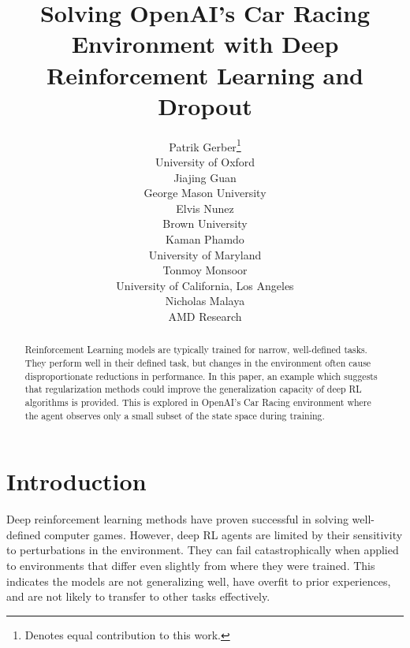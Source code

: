\documentclass{article}
\title{ %
  Solving OpenAI's
  Car Racing Environment with Deep Reinforcement Learning and Dropout}
\author{
  Patrik Gerber\thanks{Denotes equal contribution to this work.}\\
  University of Oxford \\
  \And
  Jiajing Guan\samethanks \\
  George Mason University \\ 
  \And
  Elvis Nunez\samethanks \\
  Brown University \\
  \And
  Kaman Phamdo\samethanks \\
  University of Maryland \\
  \And
  Tonmoy Monsoor \\
  University of California, Los Angeles \\
  \And
  Nicholas Malaya \\ %
  AMD Research \\ 
}
\begin{document}

\maketitle

\begin{abstract}

  


  
Reinforcement Learning models are typically trained for
narrow, well-defined tasks. They perform well in their defined task,
but changes in the environment often cause disproportionate reductions
in performance. In this paper, an example which suggests that
regularization methods could improve the generalization capacity of
deep RL algorithms is provided. 
This is explored in OpenAI’s Car Racing environment where the agent
observes only a small subset of the state space during training.
\end{abstract}

\vspace{-4mm}
\section{Introduction}
Deep reinforcement learning methods have proven successful in solving
well-defined computer
games\cite{mnih2013playing,silver2017mastering,zambaldi2018relational,bansal2017emergent}. 
However, deep RL agents are limited by their sensitivity
to perturbations in the environment. They can fail catastrophically
when applied to environments that differ even slightly from where they
were trained\cite{kansky2017schema,taylor2009transfer}. This indicates
the models are not generalizing well, have overfit to prior
experiences, and are not likely to transfer to other tasks
effectively\cite{dibangoye2018learning}. 
\end{document}
